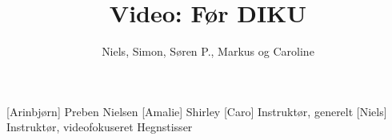 \documentclass[a4paper,11pt]{article}
\title{Video: Før DIKU}
\author{Niels, Simon, Søren P., Markus og Caroline}
\begin{document}
\maketitle

\begin{roles}
  [Arinbjørn] Preben Nielsen
  [Amalie] Shirley
  [Caro] Instruktør, generelt
  [Niels] Instruktør, videofokuseret
   Hegnstisser
\end{roles}

\begin{props}
\end{props}
\end{document}
